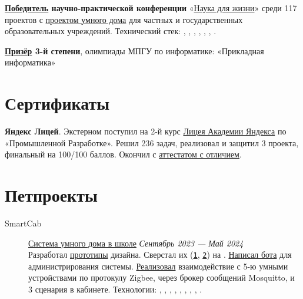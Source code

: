 \documentclass[margin,line]{resume}
\begin{document}
\begin{resume}
  \textbf{\href{https://alchemmist.github.io/CV/attachments/scince-for-life-win.pdf}{Победитель}
  научно-практической конференции}
  «\href{https://conf.profil.mos.ru/academ}{Наука для
  жизни}» среди 117 проектов с
  \href{https://github.com/smart-cab/}{проектом умного
  дома} для частных и государственных
  образовательных учреждений. Технический стек: ,
  , , ,
  , , .

  \textbf{\href{https://alchemmist.github.io/CV/attachments/informatics-olimpic.pdf}{Призёр}
  3-й степени}, олимпиады МПГУ по информатике:
  «Прикладная информатика»

  \section{\mysidestyle Сертификаты}
  \textbf{Яндекс Лицей}. Экстерном поступил на 2-й курс
  \href{https://lyceum.yandex.ru/}{Лицея
  Академии Яндекса} по «Промышленной Разработке». Решил 236 задач,
  реализовал и защитил 3 проекта, финальный на 100/100 баллов. Окончил с
  \href{https://alchemmist.github.io/CV/attachments/yandex-lyceum.pdf}{аттестатом
  с отличием}.

  \section{\mysidestyle Петпроекты}\vspace{2mm}

  \begin{description}

    \item[SmartCab]\small{\href{https://github.com/smart-cab}{Система
        умного дома в школе} \hfill
      \textsl{Сентябрь 2023 — Май 2024\vspace{1mm}}}\\
      Разработал
      \href{https://www.figma.com/design/8H1tFpxgmIDV1xp06ndi73/SmartCab?node-id=0-1&p=f}{прототипы}
      дизайна. Сверстал их
      (\texttt{\href{https://github.com/smart-cab/smartcab-hub/tree/main/frontend/src}{1}},
      \texttt{\href{https://github.com/smart-cab/smartcab-dashboard/tree/main/frontend/src}{2}})
      на .
      \href{https://github.com/smart-cab/smartcab-bot}{Написал бота}
      для администрирования системы.
      \href{https://github.com/smart-cab/smartcab-hub/blob/main/backend/smartcab/interface/mqtt.py}{Реализовал}
      взаимодействие с 5-ю умными устройствами по протокулу Zigbee, через
      брокер сообщений Mosquitto, и 3 сценария в кабинете.
      Технологии:
      , ,
      , ,
      ,
      , ,
      , .
      \vspace{3mm}


\end{description}
\end{resume}
\end{document}
